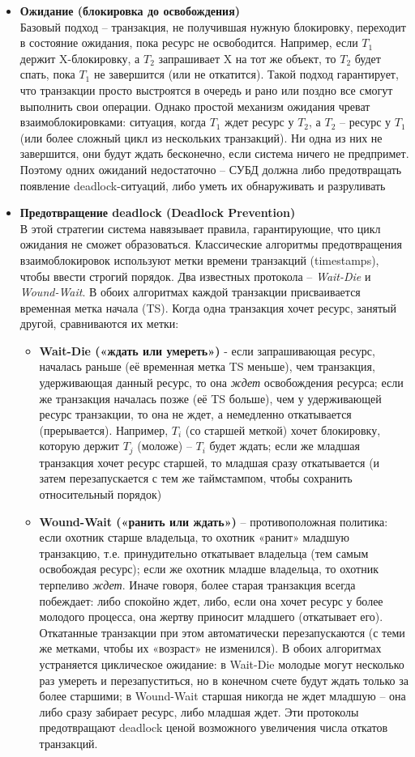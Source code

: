  \begin{itemize}
    \item \textbf{Ожидание (блокировка до освобождения)} ~\\
    Базовый подход – транзакция, не получившая нужную блокировку, переходит в состояние ожидания, пока ресурс не освободится. Например, если $T_1$ держит X-блокировку, а $T_2$ запрашивает X на тот же объект, то $T_2$ будет спать, пока $T_1$ не завершится (или не откатится). Такой подход гарантирует, что транзакции просто выстроятся в очередь и рано или поздно все смогут выполнить свои операции. Однако простой механизм ожидания чреват взаимоблокировками: ситуация, когда $T_1$ ждет ресурс у $T_2$, а $T_2$ – ресурс у $T_1$ (или более сложный цикл из нескольких транзакций). Ни одна из них не завершится, они будут ждать бесконечно, если система ничего не предпримет. Поэтому одних ожиданий недостаточно – СУБД должна либо предотвращать появление deadlock-ситуаций, либо уметь их обнаруживать и разруливать 
    \item \textbf{Предотвращение deadlock (Deadlock Prevention)} ~\\
    В этой стратегии система навязывает правила, гарантирующие, что цикл ожидания не сможет образоваться. Классические алгоритмы предотвращения взаимоблокировок используют метки времени транзакций (timestamps), чтобы ввести строгий порядок. Два известных протокола – \textit{Wait-Die} и \textit{Wound-Wait}. В обоих алгоритмах каждой транзакции присваивается временная метка начала (TS). Когда одна транзакция хочет ресурс, занятый другой, сравниваются их метки: 
    \begin{itemize}
        \item \textbf{Wait-Die («ждать или умереть»)} - если запрашивающая ресурс, началась раньше (её временная метка TS меньше), чем транзакция, удерживающая данный ресурс, то она \textit{ждет} освобождения ресурса; если же транзакция началась позже (её TS больше), чем у удерживающей ресурс транзакции, то она не ждет, а немедленно откатывается (прерывается). Например, $T_i$ (со старшей меткой) хочет блокировку, которую держит $T_j$ (моложе) – $T_i$ будет ждать; если же младшая транзакция хочет ресурс старшей, то младшая сразу откатывается (и затем перезапускается с тем же таймстампом, чтобы сохранить относительный порядок)
        \item \textbf{Wound-Wait («ранить или ждать»)} – противоположная политика: если охотник старше владельца, то охотник «ранит» младшую транзакцию, т.е. принудительно откатывает владельца (тем самым освобождая ресурс); если же охотник младше владельца, то охотник терпеливо \textit{ждет}. Иначе говоря, более старая транзакция всегда побеждает: либо спокойно ждет, либо, если она хочет ресурс у более молодого процесса, она жертву приносит младшего (откатывает его). Откатанные транзакции при этом автоматически перезапускаются (с теми же метками, чтобы их «возраст» не изменился). В обоих алгоритмах устраняется циклическое ожидание: в Wait-Die молодые могут несколько раз умереть и перезапуститься, но в конечном счете будут ждать только за более старшими; в Wound-Wait старшая никогда не ждет младшую – она либо сразу забирает ресурс, либо младшая ждет. Эти протоколы предотвращают deadlock ценой возможного увеличения числа откатов транзакций. 

\end{itemize}
\end{itemize}
